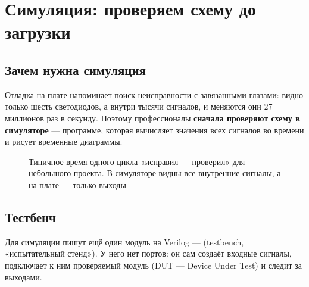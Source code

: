 \chapter{Симуляция: проверяем схему до загрузки}

\section{Зачем нужна симуляция}

Отладка на плате напоминает поиск неисправности с завязанными глазами:
видно только шесть светодиодов, а внутри тысячи сигналов, и меняются они
27 миллионов раз в секунду. Поэтому профессионалы \textbf{сначала
проверяют схему в симуляторе} --- программе, которая вычисляет значения всех
сигналов во времени и рисует временные диаграммы.

\begin{figure}[H]
\centering
{}
\caption{Типичное время одного цикла «исправил --- проверил» для небольшого
проекта. В симуляторе видны все внутренние сигналы, а на плате --- только
выходы}
\end{figure}

\section{Тестбенч}

Для симуляции пишут ещё один модуль на Verilog ---  (testbench,
«испытательный стенд»). У него нет портов: он сам создаёт входные сигналы,
подключает к ним проверяемый модуль (DUT --- Device Under Test) и
следит за выходами.

